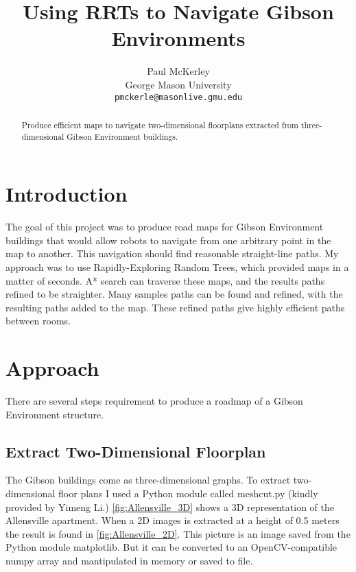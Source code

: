 \documentclass[10pt,twocolumn,letterpaper]{article}
\begin{document}
\title{Using RRTs to Navigate Gibson Environments}

\author{Paul McKerley\\
George Mason University\\
{\tt\small pmckerle@masonlive.gmu.edu}
}

\frenchspacing
\maketitle
\thispagestyle{empty}

\begin{abstract}
  Produce efficient maps to navigate two-dimensional floorplans
  extracted from three-dimensional Gibson Environment buildings.
\end{abstract}

\section{Introduction}

  The goal of this project was to produce road maps for Gibson
  Environment buildings that would allow robots to navigate from one
  arbitrary point in the map to another. This navigation should find
  reasonable straight-line paths. My approach was to use
  Rapidly-Exploring Random Trees, which provided maps in a matter of
  seconds. A* search can traverse these maps, and the results paths
  refined to be straighter. Many samples paths can be found and
  refined, with the resulting paths added to the map. These refined
  paths give highly efficient paths between rooms.

\section{Approach}

There are several steps requirement to produce a roadmap of a Gibson
Environment structure.

\subsection{Extract Two-Dimensional Floorplan}

The Gibson buildings come as three-dimensional graphs. To extract
two-dimensional floor plans I used a Python module called meshcut.py
(kindly provided by Yimeng Li.) \ref{fig:Allensville_3D} shows a 3D
representation of the Allensville apartment. When a 2D images is extracted
at a height of 0.5 meters the result is found in \ref{fig:Allensville_2D}.
This picture is an image saved from the Python module matplotlib. But it
can be converted to an OpenCV-compatible numpy array and mantipulated in
memory or saved to file.
\end{document}
